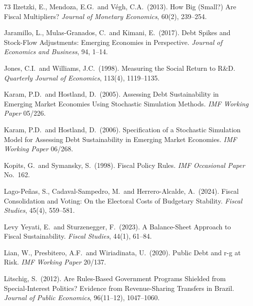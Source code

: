\documentclass[11pt,a4paper]{article}
\begin{document}
\begin{thebibliography}{73}
 Ilzetzki, E., Mendoza, E.G.\ and V\'egh, C.A.\ (2013). How Big (Small?) Are Fiscal Multipliers? \textit{Journal of Monetary Economics}, 60(2), 239--254.

 Jaramillo, L., Mulas-Granados, C.\ and Kimani, E.\ (2017). Debt Spikes and Stock-Flow Adjustments: Emerging Economies in Perspective. \textit{Journal of Economics and Business}, 94, 1--14.

 Jones, C.I.\ and Williams, J.C.\ (1998). Measuring the Social Return to R\&D. \textit{Quarterly Journal of Economics}, 113(4), 1119--1135.

 Karam, P.D.\ and Hostland, D.\ (2005). Assessing Debt Sustainability in Emerging Market Economies Using Stochastic Simulation Methods. \textit{IMF Working Paper} 05/226.

 Karam, P.D.\ and Hostland, D.\ (2006). Specification of a Stochastic Simulation Model for Assessing Debt Sustainability in Emerging Market Economies. \textit{IMF Working Paper} 06/268.

 Kopits, G.\ and Symansky, S.\ (1998). Fiscal Policy Rules. \textit{IMF Occasional Paper} No.\ 162.

 Lago-Pe\~nas, S., Cadaval-Sampedro, M.\ and Herrero-Alcalde, A.\ (2024). Fiscal Consolidation and Voting: On the Electoral Costs of Budgetary Stability. \textit{Fiscal Studies}, 45(4), 559--581.

 Levy Yeyati, E.\ and Sturzenegger, F.\ (2023). A Balance-Sheet Approach to Fiscal Sustainability. \textit{Fiscal Studies}, 44(1), 61--84.

 Lian, W., Presbitero, A.F.\ and Wiriadinata, U.\ (2020). Public Debt and r-g at Risk. \textit{IMF Working Paper} 20/137.

 Litschig, S.\ (2012). Are Rules-Based Government Programs Shielded from Special-Interest Politics? Evidence from Revenue-Sharing Transfers in Brazil. \textit{Journal of Public Economics}, 96(11--12), 1047--1060.


\end{thebibliography}
\end{document}
